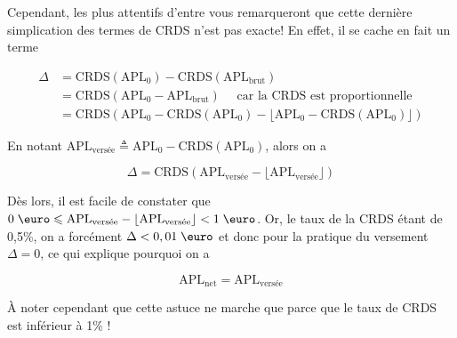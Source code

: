 \documentclass[french,11pt]{article}
\begin{document}
Cependant, les plus attentifs d'entre vous remarqueront que cette dernière simplication
des termes de CRDS n'est pas exacte! En effet, il se cache en fait un terme

\begin{align*}
  \Delta & =  \textrm{CRDS}(\textrm{APL}_0) - \textrm{CRDS}(\textrm{APL}_{\textrm{brut}} )                                                                                                 \\
         & = \textrm{CRDS}(\textrm{APL}_0 -\textrm{APL}_{\textrm{brut}}  )                                                                   \quad \text{ car la CRDS est proportionnelle} \\
         & = \textrm{CRDS}( \textrm{APL}_0 - \textrm{CRDS}(\textrm{APL}_0) - \lfloor \textrm{APL}_0 - \textrm{CRDS}(\textrm{APL}_0) \rfloor)
\end{align*}

En notant $\textrm{APL}_{\textrm{versée}} \triangleq  \textrm{APL}_0 - \textrm{CRDS}(\textrm{APL}_0)$, alors on a

\[
  \Delta = \textrm{CRDS}(\textrm{APL}_{\textrm{versée}} - \lfloor \textrm{APL}_{\textrm{versée}} \rfloor)
\]

Dès lors, il est facile de constater que $0 \; \text{\euro} \leqslant \textrm{APL}_{\textrm{versée}} - \lfloor \textrm{APL}_{\textrm{versée}}\rfloor < 1 \; \text{\euro}$.
Or, le taux de la CRDS étant de 0,5\%, on a forcément $\Delta < 0,01\;\text{\euro}$ et
donc pour la pratique du versement $\Delta = 0$, ce qui explique pourquoi on a

\[
  \textrm{APL}_{\textrm{net}} = \textrm{APL}_{\textrm{versée}}
\]

À noter cependant que cette astuce ne marche que parce que le taux de CRDS est
inférieur à 1\% !
\end{document}
